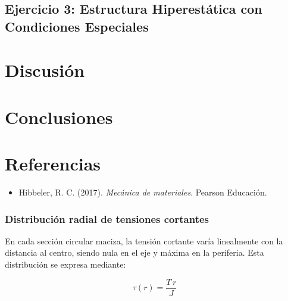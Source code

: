 \documentclass[12pt,a4paper]{article}
\begin{document}
\newpage
\pagecolor{green!50}
\subsection{Ejercicio 3: Estructura Hiperestática con Condiciones Especiales}

\section{Discusión}

\section{Conclusiones}

\section{Referencias}
\begin{itemize}
    \item Hibbeler, R. C. (2017). \textit{Mecánica de materiales}. Pearson Educación.
\end{itemize}
\subsubsection*{Distribución radial de tensiones cortantes}

En cada sección circular maciza, la tensión cortante varía linealmente con la distancia al centro, siendo nula en el eje y máxima en la periferia. Esta distribución se expresa mediante:

\begin{equation}
\tau(r)=\frac{T\,r}{J}
\end{equation}
\end{document}
